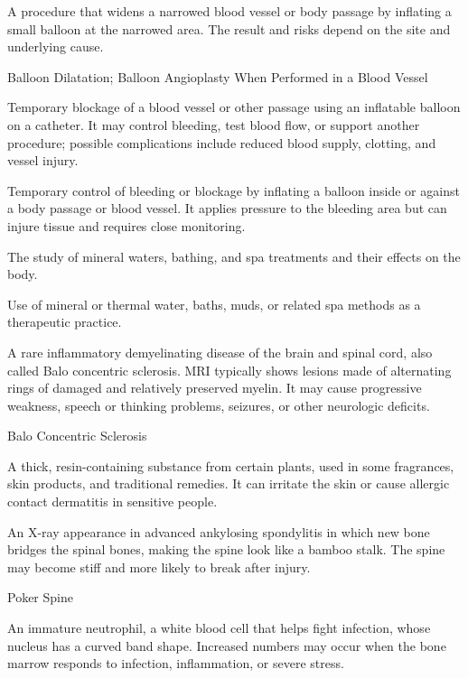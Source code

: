  A procedure that widens a narrowed blood vessel or body passage by inflating a small balloon at the narrowed area. The result and risks depend on the site and underlying cause.

\synonyms
Balloon Dilatation; Balloon Angioplasty When Performed in a Blood Vessel

 Temporary blockage of a blood vessel or other passage using an inflatable balloon on a catheter. It may control bleeding, test blood flow, or support another procedure; possible complications include reduced blood supply, clotting, and vessel injury.

 Temporary control of bleeding or blockage by inflating a balloon inside or against a body passage or blood vessel. It applies pressure to the bleeding area but can injure tissue and requires close monitoring.

 The study of mineral waters, bathing, and spa treatments and their effects on the body.

 Use of mineral or thermal water, baths, muds, or related spa methods as a therapeutic practice.

 A rare inflammatory demyelinating disease of the brain and spinal cord, also called Balo concentric sclerosis. MRI typically shows lesions made of alternating rings of damaged and relatively preserved myelin. It may cause progressive weakness, speech or thinking problems, seizures, or other neurologic deficits.

\synonyms
Balo Concentric Sclerosis

 A thick, resin-containing substance from certain plants, used in some fragrances, skin products, and traditional remedies. It can irritate the skin or cause allergic contact dermatitis in sensitive people.

 An X-ray appearance in advanced ankylosing spondylitis in which new bone bridges the spinal bones, making the spine look like a bamboo stalk. The spine may become stiff and more likely to break after injury.

\synonyms
Poker Spine

 An immature neutrophil, a white blood cell that helps fight infection, whose nucleus has a curved band shape. Increased numbers may occur when the bone marrow responds to infection, inflammation, or severe stress.

